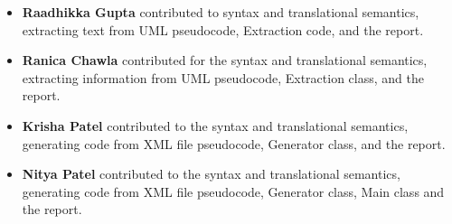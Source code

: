 \begin{itemize}
    \item {\textbf{Raadhikka Gupta} contributed to syntax and translational semantics, extracting text from UML pseudocode, Extraction code, and the report.}
    \item \textbf{Ranica Chawla} contributed for the syntax and translational semantics, extracting information from UML pseudocode, Extraction class, and the report.
	\item {\textbf{Krisha Patel} contributed to the syntax and translational semantics, generating code from XML file pseudocode, Generator class, and the report.}
	\item {\textbf{Nitya Patel} contributed to the syntax and translational semantics, generating code from XML file pseudocode, Generator class, Main class and the report.}
\end{itemize}
